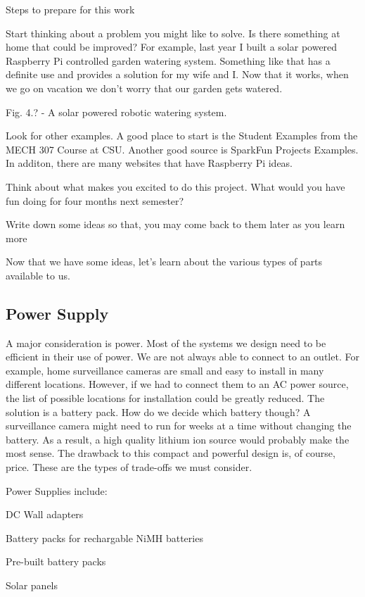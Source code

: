 \documentclass[
]{book}
\begin{document}
Steps to prepare for this work

Start thinking about a problem you might like to solve. Is there something at home that could be improved? For example, last year I built a solar powered Raspberry Pi controlled garden watering system. Something like that has a definite use and provides a solution for my wife and I. Now that it works, when we go on vacation we don't worry that our garden gets watered.

Fig. 4.? - A solar powered robotic watering system.

Look for other examples. A good place to start is the Student Examples from the MECH 307 Course at CSU. Another good source is SparkFun Projects Examples. In additon, there are many websites that have Raspberry Pi ideas.

Think about what makes you excited to do this project. What would you have fun doing for four months next semester?

Write down some ideas so that, you may come back to them later as you learn more

Now that we have some ideas, let's learn about the various types of parts available to us.

\hypertarget{power-supply}{%
\subsection{Power Supply}\label{power-supply}}

A major consideration is power. Most of the systems we design need to be efficient in their use of power. We are not always able to connect to an outlet. For example, home surveillance cameras are small and easy to install in many different locations. However, if we had to connect them to an AC power source, the list of possible locations for installation could be greatly reduced. The solution is a battery pack. How do we decide which battery though? A surveillance camera might need to run for weeks at a time without changing the battery. As a result, a high quality lithium ion source would probably make the most sense. The drawback to this compact and powerful design is, of course, price. These are the types of trade-offs we must consider.

Power Supplies include:

DC Wall adapters

Battery packs for rechargable NiMH batteries

Pre-built battery packs

Solar panels
\end{document}
